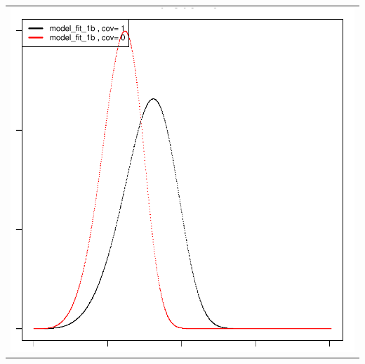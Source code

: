 \documentclass[11pt,a4paper]{article}
\begin{document}
\begin{enumerate}
\begin{minipage}{0.45\textwidth}
\begin{tabular}{|p{\textwidth}}
\includegraphics{SemiMarkov_Paper-015}
\end{tabular}
\end{minipage}%
\end{enumerate}
\end{document}
